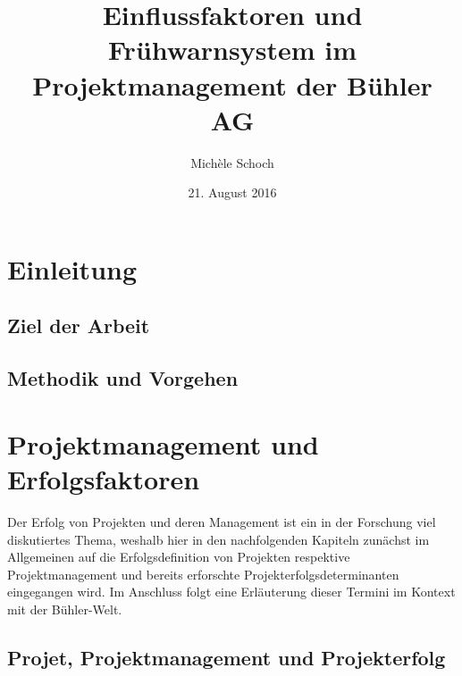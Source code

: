 \documentclass[11pt]{article}
\title{Einflussfaktoren und Frühwarnsystem im Projektmanagement der Bühler AG}
\author{Michèle Schoch}
\date{21. August 2016}
\begin{document}

\begin{titlepage}
\maketitle
\end{titlepage}

\tableofcontents

\newpage
\printnomenclature







\newpage
\section{Einleitung}
\subsection{Ziel der Arbeit}
\subsection{Methodik und Vorgehen}


\section{Projektmanagement und Erfolgsfaktoren}

Der Erfolg von Projekten und deren Management ist ein in der Forschung viel diskutiertes Thema, weshalb hier in den nachfolgenden Kapiteln zunächst im Allgemeinen auf die Erfolgsdefinition von Projekten respektive Projektmanagement und bereits erforschte Projekterfolgsdeterminanten eingegangen wird. Im Anschluss folgt eine Erläuterung dieser Termini im Kontext mit der Bühler-Welt.

\subsection{Projet, Projektmanagement und Projekterfolg}
\end{document}
